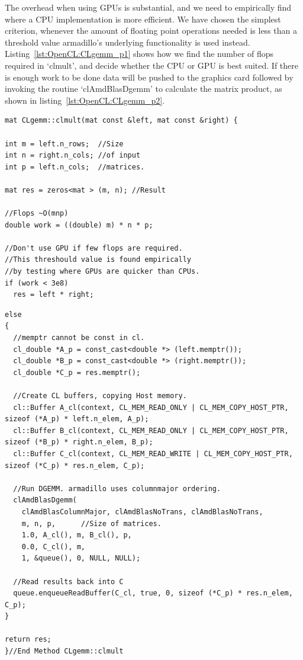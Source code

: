 The overhead when using GPUs is substantial, and we need to empirically find where a CPU implementation is more efficient.
We have chosen the simplest criterion, whenever the amount of floating point operations needed is less than a threshold value armadillo's underlying functionality is used instead.
Listing~\ref{lst:OpenCL:CLgemm_p1} shows how we find the number of flops required in `clmult', and decide whether the CPU or GPU is best suited.
If there is enough work to be done data will be pushed to the graphics card followed by invoking the routine `clAmdBlasDgemm' to calculate the matrix product, as shown in listing~\ref{lst:OpenCL:CLgemm_p2}.

\begin{lstlisting}[float,label={lst:OpenCL:CLgemm_p1},caption={Implementation of matrix multiplication on a GPU. Continued in listing~\ref{lst:OpenCL:CLgemm_p2}.},name={CLgemm}]
mat CLgemm::clmult(mat const &left, mat const &right) {

int m = left.n_rows;  //Size 
int n = right.n_cols; //of input
int p = left.n_cols;  //matrices.

mat res = zeros<mat > (m, n); //Result

//Flops ~O(mnp)
double work = ((double) m) * n * p;

//Don't use GPU if few flops are required.
//This threshould value is found empirically 
//by testing where GPUs are quicker than CPUs.
if (work < 3e8)
  res = left * right;
\end{lstlisting}
\begin{lstlisting}[float,label={lst:OpenCL:CLgemm_p2},caption={Implementation of matrix multiplication on a GPU. Continuation of listing~\ref{lst:OpenCL:CLgemm_p1}},name={CLgemm}]    
else
{
  //memptr cannot be const in cl.
  cl_double *A_p = const_cast<double *> (left.memptr());
  cl_double *B_p = const_cast<double *> (right.memptr());
  cl_double *C_p = res.memptr();
  
  //Create CL buffers, copying Host memory.
  cl::Buffer A_cl(context, CL_MEM_READ_ONLY | CL_MEM_COPY_HOST_PTR, sizeof (*A_p) * left.n_elem, A_p);
  cl::Buffer B_cl(context, CL_MEM_READ_ONLY | CL_MEM_COPY_HOST_PTR, sizeof (*B_p) * right.n_elem, B_p);
  cl::Buffer C_cl(context, CL_MEM_READ_WRITE | CL_MEM_COPY_HOST_PTR, sizeof (*C_p) * res.n_elem, C_p);
 
  //Run DGEMM. armadillo uses columnmajor ordering.
  clAmdBlasDgemm( 
    clAmdBlasColumnMajor, clAmdBlasNoTrans, clAmdBlasNoTrans,
    m, n, p,      //Size of matrices.
    1.0, A_cl(), m, B_cl(), p,
    0.0, C_cl(), m,
    1, &queue(), 0, NULL, NULL);
  
  //Read results back into C
  queue.enqueueReadBuffer(C_cl, true, 0, sizeof (*C_p) * res.n_elem, C_p); 
}

return res;
}//End Method CLgemm::clmult
\end{lstlisting}








